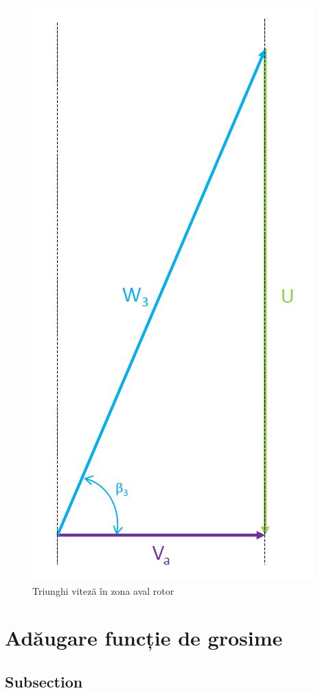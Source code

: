 \begin{figure}[t!]
	\centering
	\includegraphics[scale=0.5]{figures/triunghi_viteza_ZAR.jpg}
	\caption{Triunghi viteză în zona aval rotor}
	\label{Triunghi viteză în zona aval rotor}
\end{figure}

\clearpage


\section{Adăugare funcție de grosime}

\subsection{Subsection}